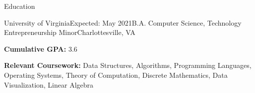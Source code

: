 \documentclass{resume}
\begin{document}
\vspace{-1em}
\begin{rSection}{Education}

  \begin{rSubsection}{University of Virginia}{Expected: May 2021}{B.A. Computer Science, Technology Entrepreneurship Minor}{Charlottesville, VA}

    \item \textbf{Cumulative GPA:} 3.6
    \item \textbf{Relevant Coursework:} Data Structures, Algorithms, Programming
    Languages, Operating Systems, Theory of Computation, Discrete Mathematics,
    Data Visualization, Linear Algebra
  \end{rSubsection}

\end{rSection}
\end{document}
